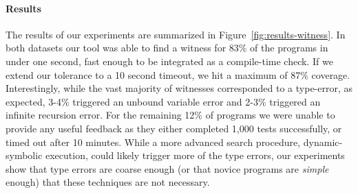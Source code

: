 \paragraph{Results}
\label{sec:results-witness}
The results of our experiments are summarized in
Figure~\ref{fig:results-witness}.
%
In both datasets our tool was able to find a witness for 83\% of the
programs in under one second, \ie fast enough to be integrated as a
compile-time check. If we extend our tolerance to a 10 second timeout,
we hit a maximum of 87\% coverage.
%
Interestingly, while the vast majority of witnesses corresponded to a
type-error, as expected, 3-4\% triggered an unbound variable error and
2-3\% triggered an infinite recursion error.
%
For the remaining 12\% of programs we were unable to provide any useful
feedback as they either completed 1,000 tests successfully, or timed out
after 10 minutes.
%
%
While a more advanced search procedure, \eg dynamic-symbolic execution,
could likely trigger more of the type errors, our experiments show that
type errors are coarse enough (or that novice programs are \emph{simple}
enough) that these techniques are not necessary.



